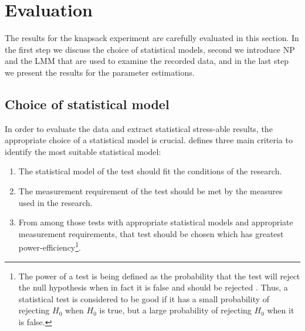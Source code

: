 
\chapter{Evaluation}
\label{ch:Evaluation}

The results for the knapsack experiment are carefully evaluated in this section. In the first step we discuss the choice of statistical models, second we introduce \acf{NP} and the \acf{LMM} that are used to examine the recorded data, and in the last step we present the results for the parameter estimations. 

\section{Choice of statistical model}
\label{ch:Evaluation:sec:StatisticalModel}

In order to evaluate the data and extract statistical stress-able results, the appropriate choice of a statistical model is crucial. 
\cite{Siegel1957} defines three main criteria to identify the most suitable statistical model:
\begin{enumerate}
\item The statistical model of the test should fit the conditions of the research.
\item The measurement requirement of the test should be met by the measures used in the research.
\item From among those tests with appropriate statistical models and appropriate measurement requirements, that test should be chosen which has greatest power-efficiency\footnote{The power of a test is being defined as the probability that the test will reject the null hypothesis when in fact it is false and should be rejected \citep{Siegel1957}. Thus, a statistical test is considered to be good if it has a small probability of rejecting $H_0$ when $H_0$ is true, but a large probability of rejecting $H_0$ when it is false.}.
\end{enumerate}

